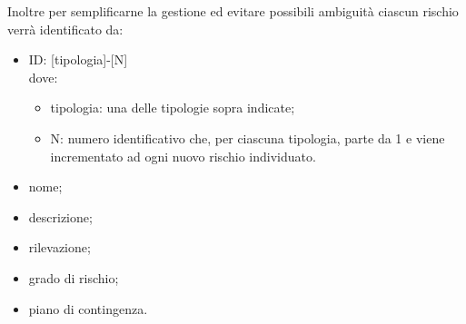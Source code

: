 Inoltre per semplificarne la gestione ed evitare possibili ambiguità ciascun rischio verrà identificato da:
\begin{itemize}
	\item ID: [tipologia]-[N] \\
		dove:
		\begin{itemize}
			\item tipologia: una delle tipologie sopra indicate;
			\item N: numero identificativo che, per ciascuna tipologia, parte da 1 e viene incrementato ad ogni nuovo rischio individuato.
		\end{itemize}
	\item nome;
	\item descrizione;
	\item rilevazione;
	\item grado di rischio;
	\item piano di contingenza.
\end{itemize}

